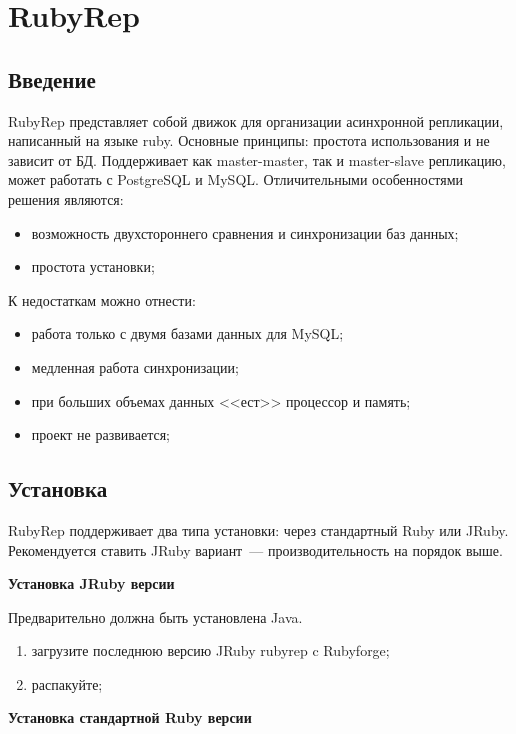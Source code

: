 \section{RubyRep}

\subsection{Введение}

RubyRep представляет собой движок для организации асинхронной репликации, написанный на языке ruby. Основные принципы: простота использования и не зависит от БД. Поддерживает как master-master, так и master-slave репликацию, может работать с PostgreSQL и MySQL. Отличительными особенностями решения являются:

\begin{itemize}
  \item возможность двухстороннего сравнения и синхронизации баз данных;
  \item простота установки;
\end{itemize}

К недостаткам можно отнести:

\begin{itemize}
  \item работа только с двумя базами данных для MySQL;
  \item медленная работа синхронизации;
  \item при больших объемах данных <<ест>> процессор и память;
  \item проект не развивается;
\end{itemize}


\subsection{Установка}

RubyRep поддерживает два типа установки: через стандартный Ruby или JRuby. Рекомендуется ставить JRuby вариант~--- производительность на порядок выше.

\textbf{Установка JRuby версии}

Предварительно должна быть установлена Java.

\begin{enumerate}
 \item загрузите последнюю версию JRuby rubyrep c Rubyforge;
 \item распакуйте;
\end{enumerate}

\textbf{Установка стандартной Ruby версии}

